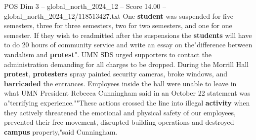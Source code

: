 \begin{textsample}{POS Dim 3 – global\_north\_2024\_12 – Score 14.00 – global\_north\_2024\_12/118513427.txt}
One \textbf{student} was suspended for five semesters, three for three semesters, two for two semesters, and one for one semester.
If they wish to readmitted after the suspensions the \textbf{students} will have to do 20 hours of community service and write an essay on the"difference between vandalism and \textbf{protest}".
UMN SDS urged supporters to contact the administration demanding for all charges to be dropped.
During the Morrill Hall \textbf{protest}, \textbf{protesters} spray painted security cameras, broke windows, and \textbf{barricaded} the entrances.
Employees inside the hall were unable to leave in what UMN President Rebecca Cunningham said in an October 22 statement was a"terrifying experience.""These actions crossed the line into illegal \textbf{activity} when they actively threatened the emotional and physical safety of our employees, prevented their free movement, disrupted building operations and destroyed \textbf{campus} property,"said Cunningham.

\end{textsample}
